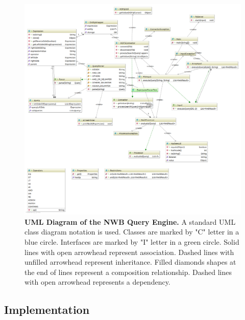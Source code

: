 \documentclass[utf8]{frontiersSCNS} %
\begin{document}
\begin{figure}
  \includegraphics[width=18cm]{diagram}
\caption[UML Diagram of the NWB Query Engine.]{\textbf{UML Diagram of the NWB Query Engine.} A standard UML class diagram notation is used. Classes are marked by "C" letter in a blue circle. Interfaces are marked by "I" letter in a green circle. Solid lines with open arrowhead represent association. Dashed lines with unfilled arrowhead represent inheritance. Filled diamonds shapes at the end of lines represent a composition relationship. Dashed lines with open arrowhead represents a dependency.}
\label{fig:diagram}
\end{figure}


\subsection{Implementation}
\label{Implementation}
\end{document}
